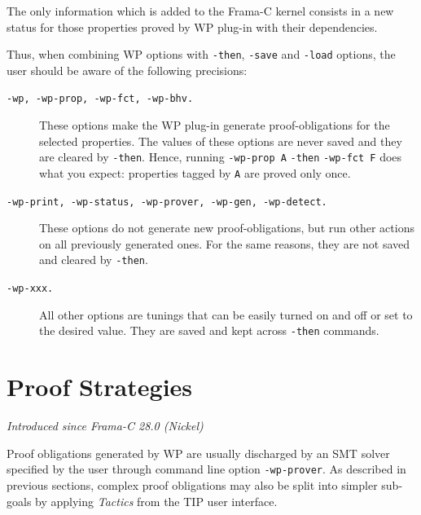 The only information which is added to the \textsf{Frama-C} kernel
consists in a new status for those properties proved by \textsf{WP} plug-in with
their dependencies.

Thus, when combining \textsf{WP}
options with \texttt{-then}, \texttt{-save} and \texttt{-load}
options, the user should be aware of the following precisions:
\begin{description}
\item[\tt -wp, -wp-prop, -wp-fct, -wp-bhv.] These options make the
  \textsf{WP} plug-in generate proof-obligations for the selected
  properties. The values of these options are never saved and they are
  cleared by \texttt{-then}. Hence, running \texttt{-wp-prop A}
  \texttt{-then} \texttt{-wp-fct F} does what you expect:
  properties tagged by \texttt{A} are proved only once.
\item[\tt -wp-print, -wp-status, -wp-prover, -wp-gen, -wp-detect.]
  These options do not
  generate new proof-obligations, but run other actions on all
  previously generated ones. For the same reasons, they are not saved
  and cleared by \texttt{-then}.
\item[\tt -wp-xxx.] All other options are tunings that can be easily
  turned on and off or set to the desired value.
  They are saved and kept across \texttt{-then} commands.
\end{description}

\section{Proof Strategies}
\label{wp-proof-strategies}

\emph{Introduced since Frama-C 28.0 (Nickel)}

Proof obligations generated by \textsf{WP} are usually discharged by an
\textsf{SMT} solver specified by the user through command line option
\verb$-wp-prover$. As described in previous sections, complex proof obligations
may also be split into simpler sub-goals by applying \emph{Tactics} from the
\textsf{TIP} user interface.

